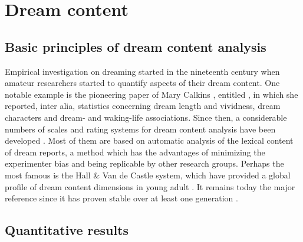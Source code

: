 \cleardoublepage

\chapter{Dream content}
\label{sec:dream-content}


\section{Basic principles of dream content analysis}
\label{sec:dream-content:method}

Empirical investigation on dreaming started in the nineteenth century when amateur researchers started to quantify aspects of their dream content. One notable example is the pioneering paper of Mary Calkins \citeyearpar{calkins_statistics_1893}, entitled , in which she reported, inter alia, statistics concerning dream length and vividness, dream characters and dream- and waking-life associations. Since then, a considerable numbers of scales and rating systems for dream content analysis have been developed \citep{schredl_dream_2010}. Most of them are based on automatic analysis of the lexical content of dream reports, a method which has the advantages of minimizing the experimenter bias and being replicable by other research groups. Perhaps the most famous is the Hall \& Van de Castle system, which have provided a global profile of dream content dimensions in young adult \citep{hall_content_1966}. It remains today the major reference since it has proven stable over at least one generation \citep{hall_dreams_1982}.

\section{Quantitative results}
\label{sec:dream-content:quant}

